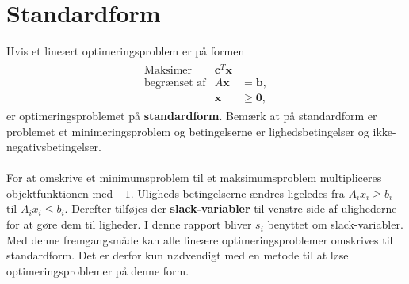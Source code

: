 \section{Standardform}
% 
Hvis et lineært optimeringsproblem er på formen
%
\begin{align*}
\begin{array}{lrl}
\text{Maksimer}		&\textbf{c}^T\textbf{x}	&				\\
\text{begrænset af}	&A\textbf{x}	&=\mathbf{b},	\\
					&\mathbf{x}				&\geq \mathbf{0},
\end{array}
\end{align*}
%
er optimeringsproblemet på \textbf{standardform}.
Bemærk at på standardform er problemet et minimeringsproblem og betingelserne er lighedsbetingelser og ikke-negativsbetingelser.\\\\
%
For at omskrive et minimumsproblem til et maksimumsproblem multipliceres objektfunktionen med $-1$.
Uligheds-betingelserne ændres ligeledes fra $A_ix_i \geq b_i$ til $A_ix_i \leq b_i$.
Derefter tilføjes der \textbf{slack-variabler} til venstre side af ulighederne for at gøre dem til ligheder.
I denne rapport bliver $s_i$ benyttet om slack-variabler.
Med denne fremgangsmåde kan alle lineære optimeringsproblemer omskrives til standardform.
Det er derfor kun nødvendigt med en metode til at løse optimeringsproblemer på denne form.
%

